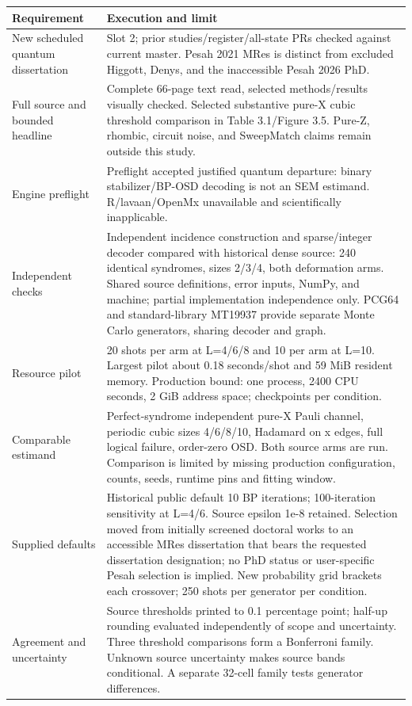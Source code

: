 \begin{longtable}{p{.23\linewidth}p{.70\linewidth}}
\toprule
Requirement & Execution and limit\\
\midrule\endhead
New scheduled quantum dissertation & Slot 2; prior studies/register/all-state PRs checked against current master. Pesah 2021 MRes is distinct from excluded Higgott, Denys, and the inaccessible Pesah 2026 PhD.\\
Full source and bounded headline & Complete 66-page text read, selected methods/results visually checked. Selected substantive pure-X cubic threshold comparison in Table 3.1/Figure 3.5. Pure-Z, rhombic, circuit noise, and SweepMatch claims remain outside this study.\\
Engine preflight & Preflight accepted justified quantum departure: binary stabilizer/BP-OSD decoding is not an SEM estimand. R/lavaan/OpenMx unavailable and scientifically inapplicable.\\
Independent checks & Independent incidence construction and sparse/integer decoder compared with historical dense source: 240 identical syndromes, sizes 2/3/4, both deformation arms. Shared source definitions, error inputs, NumPy, and machine; partial implementation independence only. PCG64 and standard-library MT19937 provide separate Monte Carlo generators, sharing decoder and graph.\\
Resource pilot & 20 shots per arm at L=4/6/8 and 10 per arm at L=10. Largest pilot about 0.18 seconds/shot and 59 MiB resident memory. Production bound: one process, 2400 CPU seconds, 2 GiB address space; checkpoints per condition.\\
Comparable estimand & Perfect-syndrome independent pure-X Pauli channel, periodic cubic sizes 4/6/8/10, Hadamard on x edges, full logical failure, order-zero OSD. Both source arms are run. Comparison is limited by missing production configuration, counts, seeds, runtime pins and fitting window.\\
Supplied defaults & Historical public default 10 BP iterations; 100-iteration sensitivity at L=4/6. Source epsilon 1e-8 retained. Selection moved from initially screened doctoral works to an accessible MRes dissertation that bears the requested dissertation designation; no PhD status or user-specific Pesah selection is implied. New probability grid brackets each crossover; 250 shots per generator per condition.\\
Agreement and uncertainty & Source thresholds printed to 0.1 percentage point; half-up rounding evaluated independently of scope and uncertainty. Three threshold comparisons form a Bonferroni family. Unknown source uncertainty makes source bands conditional. A separate 32-cell family tests generator differences.\\

\end{longtable}
